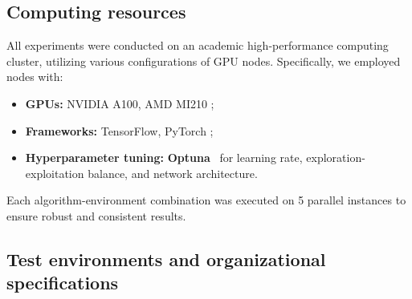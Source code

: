 \documentclass[pdflatex,sn-mathphys-num]{sn-jnl}%
\theoremstyle{thmstyleone}%
\theoremstyle{thmstyletwo}%
\theoremstyle{thmstylethree}%
\begin{document}



\subsection{Computing resources}

All experiments were conducted on an academic high-performance computing cluster, utilizing various configurations of GPU nodes. Specifically, we employed nodes with:
\begin{itemize}
    \item \textbf{GPUs:} NVIDIA A100, AMD MI210 ;
    \item \textbf{Frameworks:} TensorFlow, PyTorch ;
    \item \textbf{Hyperparameter tuning:} \textbf{Optuna}~\cite{akiba2019optuna} for learning rate, exploration-exploitation balance, and network architecture.
\end{itemize}

Each algorithm-environment combination was executed on 5 parallel instances to ensure robust and consistent results.

\subsection{Test environments and organizational specifications}
\end{document}
